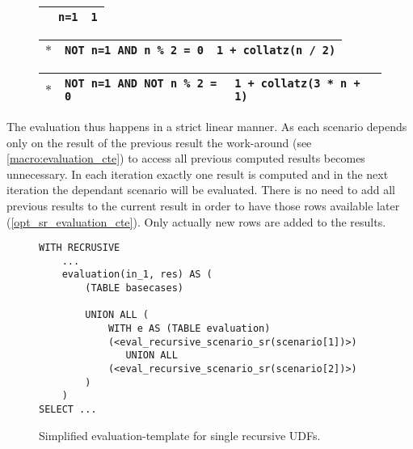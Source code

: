 \begin{figure}[h]
    \centering\footnotesize
    \begin{minipage}[b]{.45\linewidth}
    \centering
    \label{lst:collatz_udf}
    \end{minipage}
    \begin{minipage}[b]{.5\linewidth}
    \centering\ssmall
        \begin{tabular}{|p{1em}|p{3.3cm}|p{2.9cm}|}\hline
        \cellcolor{gray!25} & \texttt{\phantom{NOT }n=1} & \texttt{1}\\\hline
        \end{tabular}
        
        \begin{tabular}{|p{1em}|p{3.3cm}|p{2.9cm}|}\hline
        \cellcolor{gray!25} $\ast$ & \texttt{NOT n=1 AND \phantom{NOT }n \% 2 = 0} & \texttt{1 + collatz(n / 2)}\\\hline
        \end{tabular}
        
        \begin{tabular}{|p{1em}|p{3.3cm}|p{2.9cm}|}\hline
        \cellcolor{gray!25} $\ast$ & \texttt{NOT n=1 AND NOT n \% 2 = 0} & \texttt{1 + collatz(3 * n + 1)}\\\hline
        \end{tabular}
        \vspace{2em}
    \label{collatz_scenarios}
    \end{minipage}
    \caption{}
    \label{collatz_sql_with_scenarios}
\end{figure}

The evaluation thus happens in a strict linear manner. As each scenario depends only on the result of the previous result the work-around (see \autoref{macro:evaluation_cte}) to access all previous computed results becomes unnecessary. In each iteration exactly one result is computed and in the next iteration the dependant scenario will be evaluated. There is no need to add all previous results to the current result in order to have those rows available later (\autoref{opt_sr_evaluation_cte}). Only actually new rows are added to the results.

\begin{figure}[h!]
    \centering
    \begin{verbatim}
WITH RECRUSIVE
    ...
    evaluation(in_1, res) AS (
        (TABLE basecases)
        
        UNION ALL (
            WITH e AS (TABLE evaluation)
            (<eval_recursive_scenario_sr(scenario[1])>)
               UNION ALL
            (<eval_recursive_scenario_sr(scenario[2])>)
        )
    )
SELECT ...
    \end{verbatim}
    \caption{Simplified evaluation-template for single recursive UDFs.}
    \label{opt_sr_evaluation_cte}
\end{figure}

